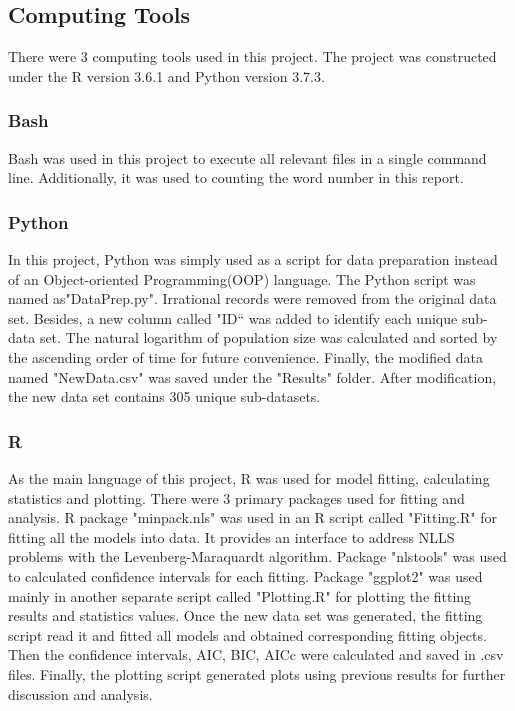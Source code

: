 \subsection{Computing Tools}
There were 3 computing tools used in this project. The project was constructed under the R version 3.6.1 and Python version 3.7.3.

\subsubsection{Bash}
Bash was used in this project to execute all relevant files in a single command line. Additionally, it was used to counting the word number in this report.
\subsubsection{Python}
In this project, Python was simply used as a script for data preparation instead of an Object-oriented Programming(OOP) language. The Python script was named as"DataPrep.py". Irrational records were removed from the original data set. Besides, a new column called "ID“ was added to identify each unique sub-data set. The natural logarithm of population size was calculated and sorted by the ascending order of time for future convenience. Finally, the modified data named "NewData.csv" was saved under the "Results" folder. After modification, the new data set contains 305 unique sub-datasets.
\subsubsection{R}
As the main language of this project, R was used for model fitting, calculating statistics and plotting. There were 3 primary packages used for fitting and analysis. R package "minpack.nls" was used in an R script called "Fitting.R" for fitting all the models into data. It provides an interface to address NLLS problems with the Levenberg-Maraquardt algorithm. Package "nlstools" was used to calculated confidence intervals for each fitting. Package "ggplot2" was used mainly in another separate script called "Plotting.R" for plotting the fitting results and statistics values. Once the new data set was generated, the fitting script read it and fitted all models and obtained corresponding fitting objects. Then the confidence intervals, AIC, BIC, AICc were calculated and saved in .csv files. Finally, the plotting script generated plots using previous results for further discussion and analysis.







